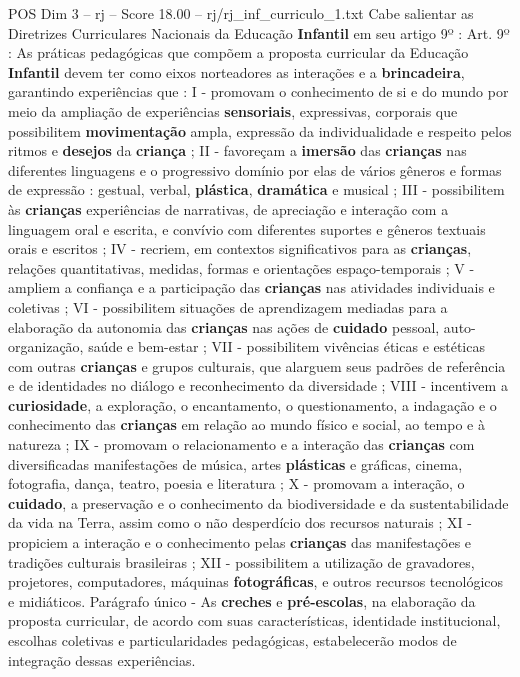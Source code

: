 \begin{textsample}{POS Dim 3 – rj – Score 18.00 – rj/rj\_inf\_curriculo\_1.txt}
Cabe salientar as Diretrizes Curriculares Nacionais da Educação \textbf{Infantil} em seu artigo 9º : Art. 9º : As práticas pedagógicas que compõem a proposta curricular da Educação \textbf{Infantil} devem ter como eixos norteadores as interações e a \textbf{brincadeira}, garantindo experiências que : I - promovam o conhecimento de si e do mundo por meio da ampliação de experiências \textbf{sensoriais}, expressivas, corporais que possibilitem \textbf{movimentação} ampla, expressão da individualidade e respeito pelos ritmos e \textbf{desejos} da \textbf{criança} ; II - favoreçam a \textbf{imersão} das \textbf{crianças} nas diferentes linguagens e o progressivo domínio por elas de vários gêneros e formas de expressão : gestual, verbal, \textbf{plástica}, \textbf{dramática} e musical ; III - possibilitem às \textbf{crianças} experiências de narrativas, de apreciação e interação com a linguagem oral e escrita, e convívio com diferentes suportes e gêneros textuais orais e escritos ; IV - recriem, em contextos significativos para as \textbf{crianças}, relações quantitativas, medidas, formas e orientações espaço-temporais ; V - ampliem a confiança e a participação das \textbf{crianças} nas atividades individuais e coletivas ; VI - possibilitem situações de aprendizagem mediadas para a elaboração da autonomia das \textbf{crianças} nas ações de \textbf{cuidado} pessoal, auto-organização, saúde e bem-estar ; VII - possibilitem vivências éticas e estéticas com outras \textbf{crianças} e grupos culturais, que alarguem seus padrões de referência e de identidades no diálogo e reconhecimento da diversidade ; VIII - incentivem a \textbf{curiosidade}, a exploração, o encantamento, o questionamento, a indagação e o conhecimento das \textbf{crianças} em relação ao mundo físico e social, ao tempo e à natureza ; IX - promovam o relacionamento e a interação das \textbf{crianças} com diversificadas manifestações de música, artes \textbf{plásticas} e gráficas, cinema, fotografia, dança, teatro, poesia e literatura ; X - promovam a interação, o \textbf{cuidado}, a preservação e o conhecimento da biodiversidade e da sustentabilidade da vida na Terra, assim como o não desperdício dos recursos naturais ; XI - propiciem a interação e o conhecimento pelas \textbf{crianças} das manifestações e tradições culturais brasileiras ; XII - possibilitem a utilização de gravadores, projetores, computadores, máquinas \textbf{fotográficas}, e outros recursos tecnológicos e midiáticos.
Parágrafo único - As \textbf{creches} e \textbf{pré-escolas}, na elaboração da proposta curricular, de acordo com suas características, identidade institucional, escolhas coletivas e particularidades pedagógicas, estabelecerão modos de integração dessas experiências.

\end{textsample}
